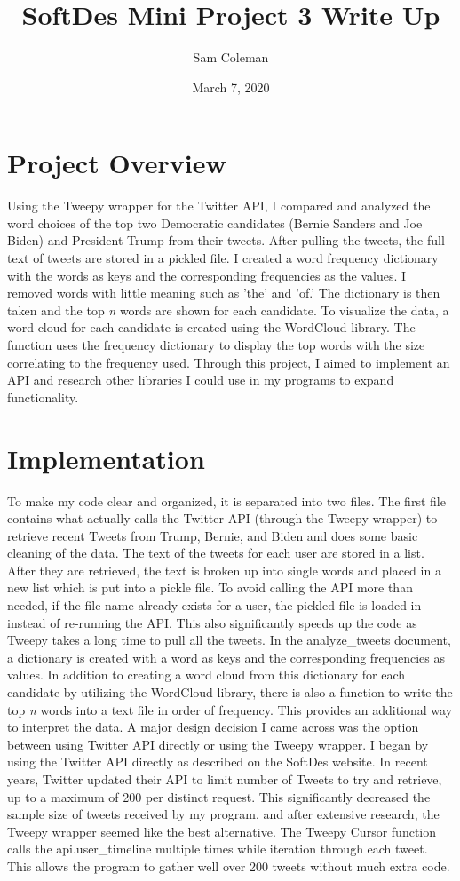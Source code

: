 \documentclass{article}
\title{SoftDes Mini Project 3 Write Up}
\author{Sam Coleman}
\date{March 7, 2020}
\begin{document}
\maketitle

\section{Project Overview}
Using the Tweepy wrapper for the Twitter API, I compared and analyzed the word choices of the top two Democratic candidates (Bernie Sanders and Joe Biden) and President Trump from their tweets. After pulling the tweets, the full text of tweets are stored in a pickled file. I created a word frequency dictionary with the words as keys and the corresponding frequencies as the values. I removed words with little meaning such as 'the' and 'of.' The dictionary is then taken and the top \textit{n} words are shown for each candidate. To visualize the data, a word cloud for each candidate is created using the WordCloud library. The function uses the frequency dictionary to display the top words with the size correlating to the frequency used. Through this project, I aimed to implement an API and research other libraries I could use in my programs to expand functionality.  

\section{Implementation}
To make my code clear and organized, it is separated into two files. The first file contains what actually calls the Twitter API (through the Tweepy wrapper) to retrieve recent Tweets from Trump, Bernie, and Biden and does some basic cleaning of the data. The text of the tweets for each user are stored in a list. After they are retrieved, the text is broken up into single words and placed in a new list which is put into a pickle file. To avoid calling the API more than needed, if the file name already exists for a user, the pickled file is loaded in instead of re-running the API. This also significantly speeds up the code as Tweepy takes a long time to pull all the tweets. In the analyze\_tweets document, a dictionary is created with a word as keys and the corresponding frequencies as values. In addition to creating a word cloud from this dictionary for each candidate by utilizing the WordCloud library, there is also a function to write the top \textit{n} words into a text file in order of frequency. This provides an additional way to interpret the data. 
\bigskip
A major design decision I came across was the option between using Twitter API directly or using the Tweepy wrapper. I began by using the Twitter API directly as described on the SoftDes website. In recent years, Twitter updated their API to limit number of Tweets to try and retrieve, up to a maximum of 200 per distinct request. This significantly decreased the sample size of tweets received by my program, and after extensive research, the Tweepy wrapper seemed like the best alternative. The Tweepy Cursor function calls the api.user\_timeline multiple times while iteration through each tweet. This allows the program to gather well over 200 tweets without much extra code.
\end{document}
